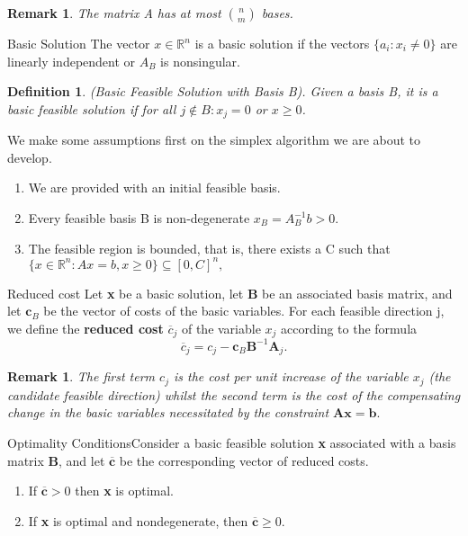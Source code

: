 \documentclass[twoside]{article}
\newtheorem{definition}[theorem]{Definition}
\newtheorem{remark}[theorem]{Remark}
\begin{document}
\begin{remark}The matrix A has at most ${n \choose m}$ bases.
\end{remark}

\begin{definition_exam}{Basic Solution}{} The vector $x \in \mathbb{R}^n$ is a basic solution if the vectors $\{a_i: x_i \neq 0\}$ are linearly independent or $A_B$ is nonsingular.
\end{definition_exam}

\begin{definition}(Basic Feasible Solution with Basis B). Given a basis B, it is a basic feasible solution if for all $j \not \in B: x_j = 0$ or $x \geq 0$.
\end{definition}



We make some assumptions first on the simplex algorithm we are about to develop.
\begin{enumerate}
\item We are provided with an initial feasible basis.
\item Every feasible basis B is non-degenerate $x_B = A_B^{-1}b > 0$.
\item The feasible region is bounded, that is, there exists a C such that $\{x \in \mathbb{R}^n: Ax = b, x \geq 0\} \subseteq [0,C]^n,$
\end{enumerate}

\begin{definition_exam}{Reduced cost}{} Let \textbf{x} be a basic solution, let \textbf{B} be an associated basis matrix, and let $\textbf{c}_B$ be the vector of costs of the basic variables. For each feasible direction j, we define the \textbf{reduced cost} $\overline{c}_j$ of the variable $x_j$ according to the formula $$\overline{c}_j = c_j - \textbf{c}_B\textbf{B}^{-1}\textbf{A}_j.$$
\end{definition_exam}

\begin{remark}The first term $c_j$ is the cost per unit increase of the variable $x_j$ (the candidate feasible direction) whilst the second term is the cost of the compensating change in the basic variables necessitated by the constraint $\textbf{A}\textbf{x} = \textbf{b}.$
\end{remark}

\begin{theorem_exam}{Optimality Conditions}{}Consider a basic feasible solution \textbf{x} associated with a basis matrix \textbf{B}, and let $\overline{\textbf{c}}$ be the corresponding vector of reduced costs. 
\begin{enumerate}
    \item If $\overline{\textbf{c}} > 0$ then \textbf{x} is optimal.
    \item If \textbf{x} is optimal and nondegenerate, then $\overline{\textbf{c}} \geq 0.$
\end{enumerate}
\end{theorem_exam}
\end{document}
